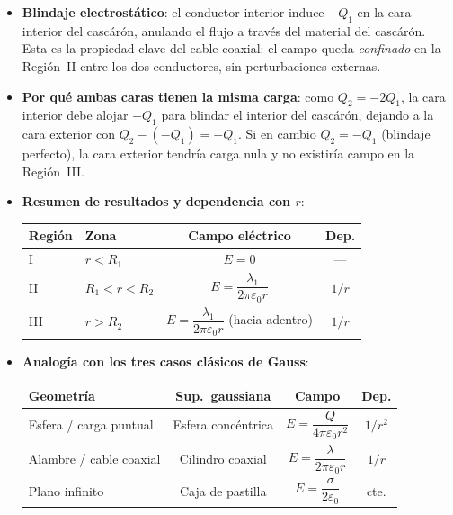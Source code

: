\documentclass[12pt,letterpaper]{article}
\begin{document}
\begin{itemize}
    \item \textbf{Blindaje electrost\'atico}: el conductor interior induce
          $-Q_1$ en la cara interior del casc\'ar\'on, anulando el flujo
          a trav\'es del material del casc\'ar\'on. Esta es la propiedad
          clave del cable coaxial: el campo queda \emph{confinado} en la
          Regi\'on~II entre los dos conductores, sin perturbaciones externas.

    \item \textbf{Por qu\'e ambas caras tienen la misma carga}:
          como $Q_2 = -2Q_1$, la cara interior debe alojar $-Q_1$
          para blindar el interior del casc\'ar\'on, dejando a la cara
          exterior con $Q_2 - (-Q_1) = -Q_1$. Si en cambio
          $Q_2 = -Q_1$ (blindaje perfecto), la cara exterior tendr\'ia
          carga nula y no existir\'ia campo en la Regi\'on~III.

    \item \textbf{Resumen de resultados y dependencia con $r$}:

    \begin{center}
    \renewcommand{\arraystretch}{1.40}
    \begin{tabular}{llcc}
    \hline
    \textbf{Regi\'on} & \textbf{Zona} & \textbf{Campo el\'ectrico} & \textbf{Dep.} \\
    \hline
    I   & $r < R_1$       & $E = 0$                                    & ---   \\
    II  & $R_1 < r < R_2$ & $E = \dfrac{\lambda_1}{2\pi\varepsilon_0 r}$ & $1/r$ \\
    III & $r > R_2$        & $E = \dfrac{\lambda_1}{2\pi\varepsilon_0 r}$
                              \enspace (hacia adentro)                   & $1/r$ \\
    \hline
    \end{tabular}
    \end{center}

    \item \textbf{Analog\'ia con los tres casos cl\'asicos de Gauss}:

    \begin{center}
    \renewcommand{\arraystretch}{1.40}
    \begin{tabular}{lccc}
    \hline
    \textbf{Geometr\'ia} & \textbf{Sup.\ gaussiana} & \textbf{Campo} & \textbf{Dep.} \\
    \hline
    Esfera / carga puntual & Esfera conc\'entrica & $E = \dfrac{Q}{4\pi\varepsilon_0 r^2}$    & $1/r^2$ \\
    Alambre / cable coaxial & Cilindro coaxial    & $E = \dfrac{\lambda}{2\pi\varepsilon_0 r}$ & $1/r$   \\
    Plano infinito          & Caja de pastilla    & $E = \dfrac{\sigma}{2\varepsilon_0}$       & cte.    \\
    \hline
    \end{tabular}
    \end{center}

\end{itemize}
\end{document}
